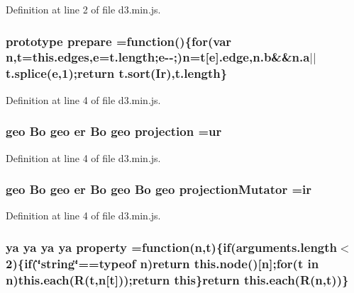 Definition at line 2 of file d3.\+min.\+js.

\subsubsection[{prepare}]{ {\bf prototype} prepare =function()\{{\bf for}(var {\bf n},t=this.\+edges,{\bf e}=t.\+length;{\bf e}-\/-\/;){\bf n}=t[{\bf e}].edge,{\bf n.\+b}\&\&{\bf n.\+a}$\vert$$\vert$t.\+splice({\bf e},1);{\bf return} {\bf t.\+sort}({\bf Ir}),t.\+length\}}\label{d3_8min_8js_ae3bafdafaa481295e6674de0cfc5680c}


Definition at line 4 of file d3.\+min.\+js.

\subsubsection[{projection}]{ {\bf geo} {\bf Bo} {\bf geo} {\bf er} {\bf Bo} {\bf geo} projection ={\bf ur}}\label{d3_8min_8js_a9af40a71084b57b978a0cf99c8c2599b}


Definition at line 4 of file d3.\+min.\+js.

\subsubsection[{projection\+Mutator}]{ {\bf geo} {\bf Bo} {\bf geo} {\bf er} {\bf Bo} {\bf geo} {\bf Bo} {\bf geo} projection\+Mutator ={\bf ir}}\label{d3_8min_8js_a148341c46d7155b8f053c67a1ad71c2d}


Definition at line 4 of file d3.\+min.\+js.

\subsubsection[{property}]{ {\bf ya} {\bf ya} {\bf ya} {\bf ya} property =function({\bf n},t)\{{\bf if}(arguments.\+length$<$2)\{{\bf if}(\char`\"{}string\char`\"{}==typeof {\bf n}){\bf return} {\bf this.\+node}()[{\bf n}];{\bf for}(t in {\bf n}){\bf this.\+each}(R(t,{\bf n}[t]));{\bf return} {\bf this}\}{\bf return} {\bf this.\+each}(R({\bf n},t))\}}\label{d3_8min_8js_a6de9500f056c5bdd3b9be4f8e7022df1}


